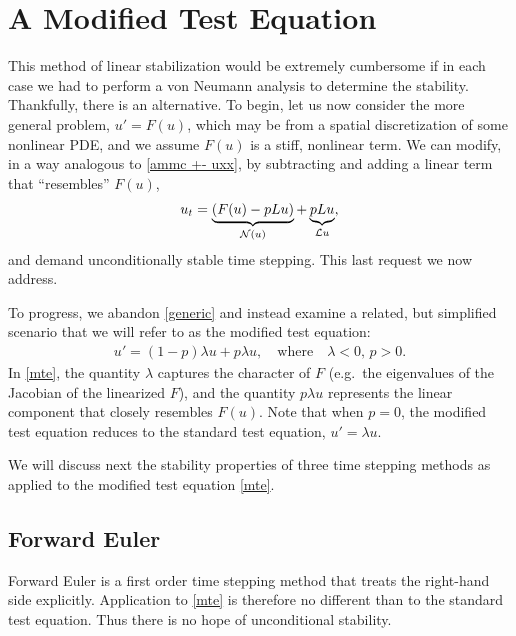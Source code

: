 \section{A Modified Test Equation}
This method of linear stabilization would be extremely cumbersome if in each case we had to perform a von Neumann analysis to determine the stability. Thankfully, there is an alternative.
To begin, let us now consider the more general problem, $u' = F(u)$, which may be from a spatial discretization of some nonlinear PDE, and we assume $F(u)$ is a stiff, nonlinear term. We can modify, in a way analogous to \eqref{ammc +- uxx}, by subtracting and adding a linear term that ``resembles'' $F(u)$,
\begin{align}
u_t = \underbrace{ (F(u) - pL u)}_{\mathcal{N}(u)} + \underbrace{pL u}_{\mathcal{L} u},
\label{generic} 
\end{align}
and demand unconditionally stable time stepping. This last request we now address.

To progress, we abandon \eqref{generic} and instead examine a related, but simplified scenario that we will refer to as the modified test equation: 
\begin{align}
u' = (1-p)\lambda u + p\lambda u,
\quad\text{where}\quad \lambda < 0\text{, } p>0.
\label{mte}
\end{align}
In \eqref{mte}, the quantity $\lambda$ captures the character of $F$ (e.g.\ the eigenvalues of the Jacobian of the linearized $F$), and the quantity $p\lambda u$ represents the linear component that closely resembles $F(u)$. Note that when $p=0$, the modified test equation reduces to the standard test equation, $u'=\lambda u$.

We will discuss next the stability properties of three time stepping methods as applied to the modified test equation \eqref{mte}.

\subsection{Forward Euler}
Forward Euler is a first order time stepping method that treats the right-hand side explicitly. Application to \eqref{mte} is therefore no different than to the standard test equation. Thus there is no hope of unconditional stability.

